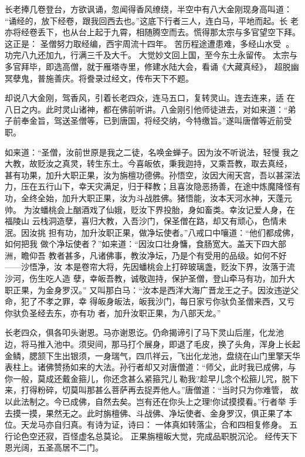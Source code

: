 长老捧几卷登台，方欲讽诵，忽闻得香风缭绕，半空中有八大金刚现身高叫道：
“诵经的，放下经卷，跟我回西去也。”这底下行者三人，连白马，平地而起。长
老亦将经卷丢下，也从台上起于九霄，相随腾空而去。慌得那太宗与多官望空下拜。
这正是：
圣僧努力取经编，西宇周流十四年。
苦历程途遭患难，多经山水受。
功完八九还加九，行满三千及大千。
大觉妙文回上国，至今东土永留传。
太宗与多官拜毕，即选高僧，就于雁塔寺里，修建水陆大会，看诵《大藏真经》，
超脱幽冥孽鬼，普施善庆。将誊录过经文，传布天下不题。

却说八大金刚，驾香风，引着长老四众，连马五口，复转灵山。连去连来，适
在八日之内。此时灵山诸神，都在佛前听讲。八金刚引他师徒进去，对如来道：“弟
子前奉金旨，驾送圣僧等，已到唐国，将经交纳，今特缴旨。”遂叫唐僧等近前受
职。

如来道：“圣僧，汝前世原是我之二徒，名唤金蝉子。因为汝不听说法，轻慢
我之大教，故贬汝之真灵，转生东土。今喜皈依，秉我迦持，又乘吾教，取去真经，
甚有功果，加升大职正果，汝为旃檀功德佛。孙悟空，汝因大闹天宫，吾以甚深法
力，压在五行山下，幸天灾满足，归于释教；且喜汝隐恶扬善，在途中炼魔降怪有
功，全终全始，加升大职正果，汝为斗战胜佛。猪悟能，汝本天河水神，天蓬元帅。
为汝蟠桃会上酗酒戏了仙娥，贬汝下界投胎，身如畜类。幸汝记爱人身，在福陵山
云栈洞造孽，喜归大教，入吾沙门，保圣僧在路，却又有顽心，色情未泯。因汝挑
担有功，加升汝职正果，做净坛使者。”八戒口中嚷道：“他们都成佛，如何把我
做个净坛使者？”如来道：“因汝口壮身慵，食肠宽大。盖天下四大部洲，瞻仰吾
教者甚多，凡诸佛事，教汝净坛，乃是个有受用的品级。如何不好——沙悟净，汝
本是卷帘大将，先因蟠桃会上打碎玻璃盏，贬汝下界，汝落于流沙河，伤生吃人造
孽，幸皈吾教，诚敬迦持，保护圣僧，登山牵马有功，加升大职正果，为金身罗汉。”
又叫那白马：“汝本是西洋大海广晋龙王之子。因汝违逆父命，犯了不孝之罪，幸
得皈身皈法，皈我沙门，每日家亏你驮负圣僧来西，又亏你驮负圣经去东，亦有功
者，加升汝职正果，为八部天龙。”

长老四众，俱各叩头谢恩。马亦谢恩讫。仍命揭谛引了马下灵山后崖，化龙池
边，将马推入池中。须臾间，那马打个展身，即退了毛皮，换了头角，浑身上长起
金鳞，腮颔下生出银须，一身瑞气，四爪祥云，飞出化龙池，盘绕在山门里擎天华
表柱上。诸佛赞扬如来的大法。孙行者却又对唐僧道：“师父，此时我已成佛，与
你一般，莫成还戴金箍儿，你还念甚么紧箍咒儿勒我?趁早儿念个松箍儿咒，脱下
来，打得粉碎，切莫叫那甚么菩萨再去捉弄他人。”唐僧道：“当时只为你难管，
故以此法制之。今已成佛，自然去矣。岂有还在你头上之理!你试摸摸看。”行者举
手去摸一摸，果然无之。此时旃檀佛、斗战佛、净坛使者、金身罗汉，俱正果了本
位。天龙马亦自归真。有诗为证，诗曰：
一体真如转落尘，合和四相复修身。
五行论色空还寂，百怪虚名总莫论。
正果旃檀皈大觉，完成品职脱沉沦。
经传天下恩光阔，五圣高居不二门。

